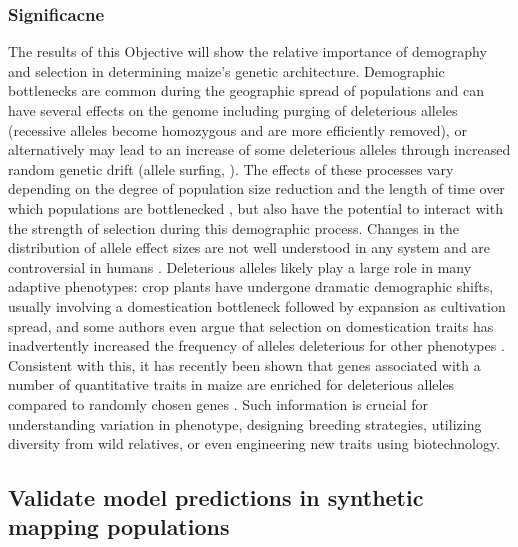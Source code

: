 \subsubsection*{Significacne} \vspace{-1ex}
The results of this Objective will show the relative importance of demography and selection in determining maize's genetic architecture. Demographic bottlenecks are common during the geographic spread of populations and can have several effects on the genome including purging of deleterious alleles (recessive alleles become homozygous and are more efficiently removed), or alternatively may lead to an increase of some deleterious alleles through increased random genetic drift (allele surfing, \citealt{Klopfstein:2005bl}). The effects of these processes vary depending on the degree of population size reduction and the length of time over which populations are bottlenecked \citep[e.g.][]{Caplins:2008ke}, but also have the potential to interact with the strength of selection during this demographic process. Changes in the distribution of allele effect sizes are not well understood in any system and are controversial in humans \citep{Hancock:2011jb, Henn:2015ce, Henn:2015dp, Lohmueller:2014dn, Simons:2014fj}. Deleterious alleles likely play a large role in many adaptive phenotypes: crop plants have undergone dramatic demographic shifts, usually involving a domestication bottleneck followed by expansion as cultivation spread, and some authors even argue that selection on domestication traits has inadvertently increased the frequency of alleles deleterious for other phenotypes \citep{Gunther:2010}. Consistent with this, it has recently been shown that genes associated with a number of quantitative traits in maize are enriched for deleterious alleles compared to randomly chosen genes \citep{Mezmouk:2014jd}. Such information is crucial for understanding variation in phenotype, designing breeding strategies, utilizing diversity from wild relatives, or even engineering new traits using biotechnology. 


\subsection{Validate model predictions in synthetic mapping populations}\vspace{-1ex}
\label{validation}

